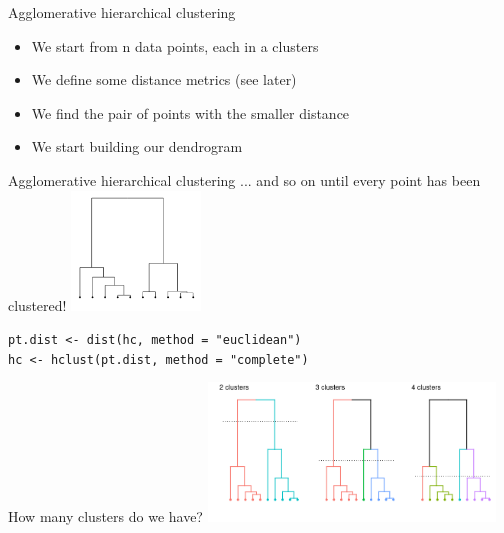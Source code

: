 \documentclass[9pt]{beamer}
\begin{document}
\begin{frame}
{Agglomerative hierarchical clustering}
\begin{itemize}
\item We start from n data points, each in a clusters
\item We define some distance metrics (see later)
\item We find the pair of points with the smaller distance
\item We start building our dendrogram
\end{itemize}

\begin{overprint}
\end{overprint}
\end{frame}

\begin{frame}
{Agglomerative hierarchical clustering}
... and so on until every point has been clustered!
\centering \includegraphics[height=120px]{finaldendro.png}
\pause
\begin{codebox}
\texttt{pt.dist  <- dist(hc, method = "euclidean")}\\
\texttt{hc <- hclust(pt.dist, method = "complete")}
\end{codebox}
\end{frame}

\begin{frame}
{How many clusters do we have?}
\centering \includegraphics[height=140px]{hc5.png}
\end{frame}
\end{document}
